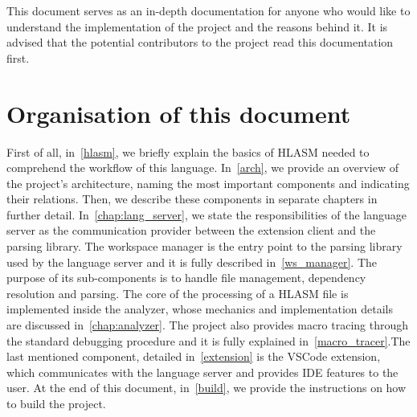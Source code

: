 This document serves as an in-depth documentation for anyone who would like to understand the implementation of the project and the reasons behind it. It is advised that the potential contributors to the project read this documentation first.

\section{Organisation of this document}
First of all, in~\cref{hlasm}, we briefly explain the basics of HLASM needed to comprehend the workflow of this language. In~\cref{arch}, we provide an overview of the project's architecture, naming the most important components and indicating their relations. Then, we describe these components in separate chapters in further detail. In~\cref{chap:lang_server}, we state the responsibilities of the language server as the communication provider between the extension client and the parsing library. The workspace manager is the entry point to the parsing library used by the language server and it is fully described in~\cref{ws_manager}. The purpose of its sub-components is to handle file management, dependency resolution and parsing. The core of the processing of a HLASM file is implemented inside the analyzer, whose mechanics and implementation details are discussed in~\cref{chap:analyzer}. The project also provides macro tracing through the standard debugging procedure and it is fully explained in~\cref{macro_tracer}.The last mentioned component, detailed in~\cref{extension} is the VSCode extension, which communicates with the language server and provides IDE features to the user. At the end of this document, in~\cref{build}, we provide the instructions on how to build the project.
